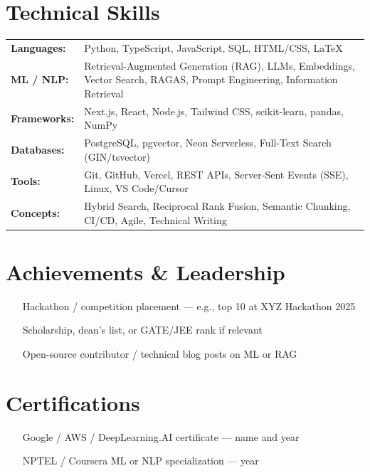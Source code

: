 \documentclass[11pt,letterpaper]{article}
\begin{document}
\section{Technical Skills}
\begin{tabularx}{\textwidth}{@{}l X@{}}
\textbf{Languages:} & Python, TypeScript, JavaScript, SQL, HTML/CSS, \LaTeX \\
\textbf{ML / NLP:} & Retrieval-Augmented Generation (RAG), LLMs, Embeddings, Vector Search, RAGAS, Prompt Engineering, Information Retrieval \\
\textbf{Frameworks:} & Next.js, React, Node.js, Tailwind CSS, scikit-learn, pandas, NumPy \\
\textbf{Databases:} & PostgreSQL, pgvector, Neon Serverless, Full-Text Search (GIN/tsvector) \\
\textbf{Tools:} & Git, GitHub, Vercel, REST APIs, Server-Sent Events (SSE), Linux, VS Code/Cursor \\
\textbf{Concepts:} & Hybrid Search, Reciprocal Rank Fusion, Semantic Chunking, CI/CD, Agile, Technical Writing \\
\end{tabularx}

\section{Achievements \& Leadership}
\begin{itemize}
  \item [Hackathon / competition placement --- e.g., top 10 at XYZ Hackathon 2025]
  \item [Scholarship, dean's list, or GATE/JEE rank if relevant]
  \item [Open-source contributor / technical blog posts on ML or RAG]
\end{itemize}

\section{Certifications}
\begin{itemize}
  \item [Google / AWS / DeepLearning.AI certificate --- name and year]
  \item [NPTEL / Coursera ML or NLP specialization --- year]
\end{itemize}
\end{document}
